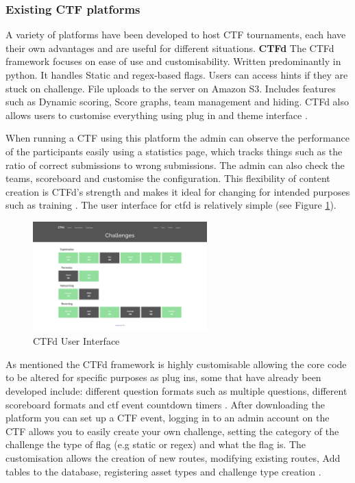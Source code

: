\documentclass[12pt,a4paper]{article}
\begin{document}
\subsubsection{Existing CTF platforms}  
A variety of platforms have been developed to host CTF tournaments, each have their own advantages and are useful for different situations.  
\textbf{CTFd} 
The CTFd framework focuses on ease of use and customisability.  Written predominantly in python. It handles Static and regex-based flags. Users can access hints if they are stuck on challenge. File uploads to the server on Amazon S3. Includes features such as Dynamic scoring, Score graphs, team management and hiding. CTFd also allows users to customise everything using plug in and theme interface \cite{ctfd}.   

When running a CTF using this platform the admin can observe the performance of the participants easily using a statistics page, which tracks things such as the ratio of correct submissions to wrong submissions. The admin can also check the teams, scoreboard and customise the configuration. This flexibility of content creation is CTFd's strength and makes it ideal for changing for intended purposes such as training \cite{noor2018usability}. The user interface for ctfd is relatively simple (see Figure \ref{fig:fig4}).

\begin{figure}[h]
    \centering
    \includegraphics[width=0.6\textwidth]{Figs/ctfd.png} 
    \caption{CTFd User Interface}
    \label{fig:fig4}
\end{figure} 

As mentioned the CTFd framework is highly customisable allowing the core code to be altered for specific purposes as plug ins, some that have already been developed include: different question formats such as multiple questions, different scoreboard formats and ctf event countdown timers \cite{ctfdplugin}. After downloading the platform you can set up a CTF event, logging in to an admin account on the CTF allows you to easily create your own challenge, setting the category of the challenge the type of flag (e.g static or regex) and what the flag is. The customisation allows the creation of new routes, modifying existing routes, Add tables to the database, registering asset types and challenge type creation \cite{ctfdplugin2}.     
\end{document}
